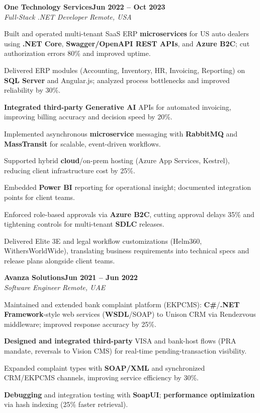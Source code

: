 \documentclass[letterpaper,10pt]{article}
\newcommand{\headingBf}[2]{
  \hspace{10pt}\textbf{#1}\hfill\textbf{#2}\\
}
\newcommand{\headingIt}[2]{
  \hspace{10pt}\textit{#1}\hfill\textit{#2}\\
}
\newenvironment{resume_list}{
  \vspace{-7pt}
  \begin{itemize}[itemsep=-2px, parsep=1pt, leftmargin=30pt]
}{
  \end{itemize}
}
\begin{document}
\headingBf{One Technology Services}{Jun 2022 -- Oct 2023}
\headingIt{Full-Stack .NET Developer \hfill Remote, USA}{}
\begin{resume_list}
    \item Built and operated multi-tenant SaaS ERP \textbf{microservices} for US auto dealers using \textbf{.NET Core}, \textbf{Swagger/OpenAPI REST APIs}, and \textbf{Azure B2C}; cut authorization errors 80\% and improved uptime.
    \item Delivered ERP modules (Accounting, Inventory, HR, Invoicing, Reporting) on \textbf{SQL Server} and Angular.js; analyzed process bottlenecks and improved reliability by 30\%.
    \item \textbf{Integrated third-party} \textbf{Generative AI} APIs for automated invoicing, improving billing accuracy and decision speed by 20\%.
    \item Implemented asynchronous \textbf{microservice} messaging with \textbf{RabbitMQ} and \textbf{MassTransit} for scalable, event-driven workflows.
    \item Supported hybrid \textbf{cloud}/on-prem hosting (Azure App Services, Kestrel), reducing client infrastructure cost by 25\%.
    \item Embedded \textbf{Power BI} reporting for operational insight; documented integration points for client teams.
    \item Enforced role-based approvals via \textbf{Azure B2C}, cutting approval delays 35\% and tightening controls for multi-tenant \textbf{SDLC} releases.
    \item Delivered Elite 3E and legal workflow customizations (Helm360, WithersWorldWide), translating business requirements into technical specs and release plans alongside client teams.
\end{resume_list}

\headingBf{Avanza Solutions}{Jun 2021 -- Jun 2022}
\headingIt{Software Engineer \hfill Remote, UAE}{}
\begin{resume_list}
    \item Maintained and extended bank complaint platform (EKPCMS): \textbf{C\#}/\textbf{.NET Framework}-style web services (\textbf{WSDL}/SOAP) to Unison CRM via Rendezvous middleware; improved response accuracy by 25\%.
    \item \textbf{Designed and integrated third-party} VISA and bank-host flows (PRA mandate, reversals to Vision CMS) for real-time pending-transaction visibility.
    \item Expanded complaint types with \textbf{SOAP/XML} and synchronized CRM/EKPCMS channels, improving service efficiency by 30\%.
    \item \textbf{Debugging} and integration testing with \textbf{SoapUI}; \textbf{performance optimization} via hash indexing (25\% faster retrieval).
\end{resume_list}
\end{document}
